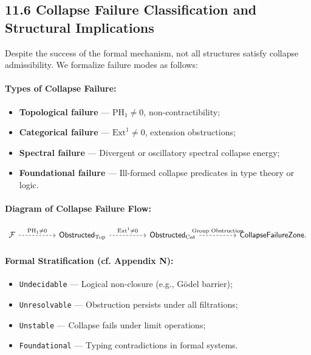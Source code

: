 \documentclass[11pt]{article}
\begin{document}
\subsection*{11.6 Collapse Failure Classification and Structural Implications}

Despite the success of the formal mechanism, not all structures satisfy collapse admissibility. We formalize failure modes as follows:

\paragraph{Types of Collapse Failure:}

\begin{itemize}
    \item \textbf{Topological failure} — \( \mathrm{PH}_1 \neq 0 \), non-contractibility;
    \item \textbf{Categorical failure} — \( \mathrm{Ext}^1 \neq 0 \), extension obstructions;
    \item \textbf{Spectral failure} — Divergent or oscillatory spectral collapse energy;
    \item \textbf{Foundational failure} — Ill-formed collapse predicates in type theory or logic.
\end{itemize}

\paragraph{Diagram of Collapse Failure Flow:}

\[
\begin{tikzcd}[column sep=huge]
\mathcal{F} \arrow[r, dashed, "\mathrm{PH}_1 \not= 0"] 
& \mathsf{Obstructed}_{\mathrm{Top}} \arrow[r, dashed, "\mathrm{Ext}^1 \not= 0"] 
& \mathsf{Obstructed}_{\mathrm{Cat}} \arrow[r, dashed, "\text{Group Obstruction}"] 
& \mathsf{CollapseFailureZone}.
\end{tikzcd}
\]

\paragraph{Formal Stratification (cf. Appendix N):}

\begin{itemize}
    \item \texttt{Undecidable} — Logical non-closure (e.g., Gödel barrier);
    \item \texttt{Unresolvable} — Obstruction persists under all filtrations;
    \item \texttt{Unstable} — Collapse fails under limit operations;
    \item \texttt{Foundational} — Typing contradictions in formal systems.
\end{itemize}
\end{document}
